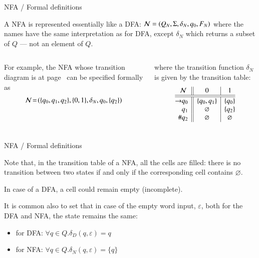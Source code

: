 \documentclass[compress,dvips,xcolor={dvipsnames},t]{beamer}
\begin{document}
%
\begin{frame}{NFA / Formal definitions}

\label{nfa_01_suffix_table}

A NFA is represented essentially like a DFA:
\(
{\cal N} = (Q_N, \Sigma, \delta_N, q_0, F_N)
\)
where the names have the same interpretation as for DFA, except
\(\delta_N\) which returns a subset of \(Q\) --- not an element of
\(Q\).

\bigskip

\begin{columns}

   For example, the NFA whose transition diagram
  is at page~\pageref{nfa_01_suffix} can be specified formally as
  \[
    {\cal N} \!=\! (\{q_0, q_1, q_2\}, \{0, 1\}, \delta_N, q_0, \{q_2\})
  \]

   where the transition function \(\delta_N\) is
  given by the transition table:
  \[
  \begin{array}{@{}r@{}l||c|c@{}}
    \multicolumn{2}{c||}{\cal N} & 0 & 1\\
    \hline\hline
    \rightarrow & q_0 & \{q_0, q_1\} & \{q_0\}\\
                & q_1 & \varnothing  & \{q_2\}\\
    \#          & q_2 & \varnothing  & \varnothing
  \end{array}
  \]
\end{columns}

\end{frame}

%
\begin{frame}{NFA / Formal definitions}

Note that, in the transition table of a NFA, all the cells are
filled: there is no transition between two states if and only if the
corresponding cell contains \(\varnothing\).

\bigskip

In case of a DFA, a cell could remain empty (incomplete).

\bigskip

It is common also to set that in case of the empty word input,
\(\varepsilon\), both for the DFA and NFA, the state remains the
same:
\begin{itemize}

  \item for DFA: \(\forall q \in Q.\delta_D (q, \varepsilon) = q\)

  \item for NFA: \(\forall q \in Q.\delta_N (q, \varepsilon) = \{q\}\)

\end{itemize}

\end{frame}
\end{document}
